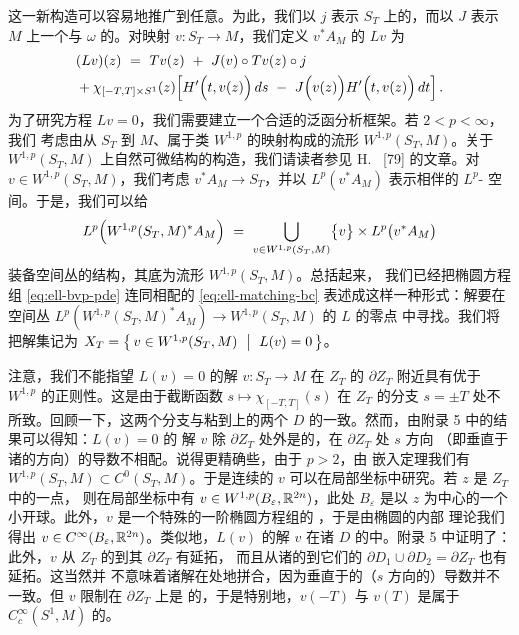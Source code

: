这一新构造可以容易地推广到任意\trCompact\trSymplecticManifold。为此，我们以 $j$%
表示 $S_{T}$ 上的\trComplexStructure，而以 $J$ 表示 $M$ 上一个与 $\omega$%
\trCompatible{}的\trAlmostComplexStructure。对映射 $v:S_{T}\to M$，我们定义%
$v^{*}A_{M}$ 的\trSection{} $Lv$ 为
\begin{equation}\label{eq:ell-lv-general}
\begin{aligned}
&(Lv)(z)\ =\ Tv(z)\ +\ J(v)\circ Tv(z)\circ j\\
&+\chi_{[-T,T]\times S^{1}}(z)\Bigl[H'\Bigl(t,v(z)\Bigr)\,ds\ -\ J\Bigl(v(z)\Bigr)H'\Bigl(t,v(z)\Bigr)\,dt\Bigr]\,.
\end{aligned}
\end{equation}
为了研究方程 $Lv=0$，我们需要建立一个合适的泛函分析框架。若 $2<p<\infty$，我们%
考虑由从 $S_{T}$ 到 $M$、属于\trSobolev{}类 $W^{1,p}$ 的映射构成的\trBanach{}流形%
$W^{1,p}(S_{T},M)$。关于 $W^{1,p}(S_{T},M)$ 上自然可微结构的构造，我们请读者参见%
H.~\trEliasson{} [79] 的文章。对 $v\in W^{1,p}(S_{T},M)$，我们考虑\trBundle{}%
$v^{*}A_{M}\to S_{T}$，并以 $L^{p}(v^{*}A_{M})$ 表示相伴的 $L^{p}$-\trSection{}%
空间。于是，我们可以给
\[
L^{p}\Bigl(W^{1,p}(S_{T},M)^{*}A_{M}\Bigr)\ =\ \bigcup_{v\in W^{1,p}(S_{T},M)}\bigl\{v\bigr\}\times L^{p}\bigl(v^{*}A_{M}\bigr)
\]
装备\trBanach{}空间丛的结构，其底为\trBanach{}流形 $W^{1,p}(S_{T},M)$。总括起来，%
我们已经把椭圆方程组 \eqref{eq:ell-bvp-pde} 连同相配的\trBoundaryCondition{}%
\eqref{eq:ell-matching-bc} 表述成这样一种形式：解要在\trBanach{}空间丛%
$L^{p}(W^{1,p}(S_{T},M)^{*}A_{M})\to W^{1,p}(S_{T},M)$ 的\trSection{} $L$ 的零点%
中寻找。我们将把解集记为
$X_{T}=\bigl\{\,v\in W^{1,p}(S_{T},M)\ \bigm|\ L(v)=0\,\bigr\}$。

注意，我们不能指望 $L(v)=0$ 的解 $v:S_{T}\to M$ 在\trCylinder{} $Z_{T}$ 的%
\trBoundary{} $\partial Z_{T}$ 附近具有优于 $W^{1,p}$ 的正则性。这是由于截断函数%
$s\mapsto\chi_{[-T,T]}(s)$ 在 $Z_{T}$ 的\trBoundary{}分支 $s=\pm T$ 处不%
\trSmooth{}所致。回顾一下，这两个\trBoundary{}分支与粘到\trCylinder{}上的两个%
\trDisc{} $D$ 的\trBoundary{}一致。然而，由附录 5 中的结果可以得知：$L(v)=0$ 的%
解 $v$ 除 $\partial Z_{T}$ 处外是\trSmooth{}的，在 $\partial Z_{T}$ 处 $s$ 方向%
（即垂直于诸\trBoundary{}的方向）的导数不相配。说得更精确些，由于 $p>2$，由%
\trSobolev{}嵌入定理我们有 $W^{1,p}(S_{T},M)\subset C^{0}(S_{T},M)$。于是连续的%
$v$ 可以在局部坐标中研究。若 $z$ 是\trCylinder{} $Z_{T}$ \trInterior{}中的一点，%
则在局部坐标中有 $v\in W^{1,p}(B_{\varepsilon},\mathbb{R}^{2n})$，此处 $B_{\varepsilon}$%
是以 $z$ 为中心的一个小开球。此外，$v$ 是一个特殊的一阶椭圆方程组的%
\trWeakSolution，于是由椭圆\trPartialDifferentialEquation{}的内部\trRegularity%
理论我们得出 $v\in C^{\infty}(B_{\varepsilon},\mathbb{R}^{2n})$。类似地，$L(v)$ 的解 $v$%
在诸\trDisc{} $D$ 的\trInterior{}中\trSmooth。附录 5 中证明了：此外，$v$ 从%
$Z_{T}$ 的\trInterior{}到其\trBoundary{} $\partial Z_{T}$ 有\trSmooth{}延拓，%
而且从诸\trDisc{}的\trInterior{}到它们的\trBoundary{}%
$\partial D_{1}\cup\partial D_{2}=\partial Z_{T}$ 也有\trSmooth{}延拓。这当然并%
不意味着诸解在\trBoundary{}处\trSmooth{}地拼合，因为垂直于\trBoundary{}的（$s$%
方向的）导数并不一致。但 $v$ 限制在\trBoundary{} $\partial Z_{T}$ 上是%
\trSmooth{}的，于是特别地，$v(-T)$ 与 $v(T)$ 是属于 $C^{\infty}_{c}(S^{1},M)$%
的\trSmooth\trLoop。

